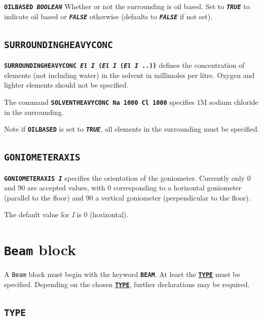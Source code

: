 \documentclass[a4paper]{article}
\newcommand{\Class}[1]{\texttt{#1}\xspace}
\newcommand{\Keyword}[1]{\texttt{\textbf{#1}}\xspace}
\begin{document}
\noindent \Keyword{OILBASED \textit{BOOLEAN}}
Whether or not the surrounding is oil based. Set to \Keyword{\textit{TRUE}} to indicate oil based or \Keyword{\textit{FALSE}} otherwise (defaults to \Keyword{\textit{FALSE}} if not set).

\subsection{\Keyword{SURROUNDINGHEAVYCONC}}
\label{surroundingheavyconc}

\noindent \Keyword{SURROUNDINGHEAVYCONC \textit{El I} (\textit{El I} (\textit{El I} ..))}
defines the concentration of elements (not including water) in the solvent in millimoles per litre. Oxygen and lighter elements should not be specified.

The command \Keyword{SOLVENTHEAVYCONC Na 1000 Cl 1000} specifies 1M sodium chloride in the surrounding.

Note if \Keyword{OILBASED} is set to \Keyword{\textit{TRUE}}, all elements in the surrounding must be specified.

\subsection{\Keyword{GONIOMETERAXIS}}
\label{goniometeraxis}

\noindent \Keyword{GONIOMETERAXIS \textit{I}}
specifies the orientation of the goniometer. Currently only 0 and 90 are accepted values, with 0 corresponding to a horizontal
goniometer (parallel to the floor) and 90 a vertical goniometer (perpendicular to the floor).

The default value for \textit{I} is 0 (horizontal).


\label{RDv3End}


\section{\Class{Beam} block}

A \Class{Beam} block must begin with the keyword \Keyword{BEAM}.
At least the \hyperref[beamtype]{\Keyword{TYPE}} must be specified.
Depending on the chosen \hyperref[beamtype]{\Keyword{TYPE}}, further declarations may be required.


\subsection{\Keyword{TYPE}}
\label{beamtype}
\end{document}
